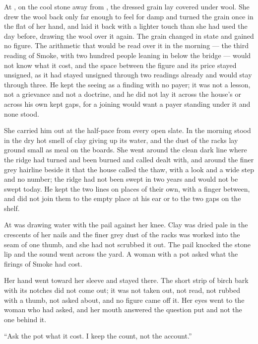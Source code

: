 At , on the cool stone away from , the dressed grain lay covered under wool. She drew the wool back only far enough to feel for damp and turned the grain once in the flat of her hand, and laid it back with a lighter touch than she had used the day before, drawing the wool over it again. The grain changed in state and gained no figure. The arithmetic that would be read over it in the morning --- the third reading of Smoke, with two hundred people leaning in below the bridge --- would not know what it cost, and the space between the figure and its price stayed unsigned, as it had stayed unsigned through two readings already and would stay through three. He kept the seeing as a finding with no payer; it was not a lesson, not a grievance and not a doctrine, and he did not lay it across the house's  or across his own kept gaps, for a joining would want a payer standing under it and none stood.

She carried him out at the half-pace from every open slate. In  the morning stood in the dry hot smell of clay giving up its water, and the dust of the racks lay ground small as meal on the boards. She went around the clean dark line where the  ridge had turned and been burned and called dealt with, and around the finer grey hairline beside it that the house called the thaw, with a look and a wide step and no number; the ridge had not been swept in two years and would not be swept today. He kept the two lines on places of their own, with a finger between, and did not join them to the empty place at his ear or to the two gaps on the shelf.

At   was drawing water with the pail against her knee. Clay was dried pale in the crescents of her nails and the finer grey dust of the racks was worked into the seam of one thumb, and she had not scrubbed it out. The pail knocked the stone lip and the sound went across the yard. A woman with a pot asked what the firings of Smoke had cost.

Her hand went toward her sleeve and stayed there. The short strip of birch bark with its notches did not come out; it was not taken out, not read, not rubbed with a thumb, not asked about, and no figure came off it. Her eyes went to the woman who had asked, and her mouth answered the question put and not the one behind it.

“Ask the pot what it cost. I keep the count, not the account.”

